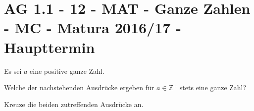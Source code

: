 \section{AG 1.1 - 12 - MAT - Ganze Zahlen - MC - Matura 2016/17 - Haupttermin}

\begin{beispiel}[AG 1.1]{1} %
	Es sei $a$ eine positive ganze Zahl.
			
Welche der nachstehenden Ausdrücke ergeben für $a\in \mathbb{Z}^+$ stets eine ganze Zahl? 

Kreuze die beiden zutreffenden Ausdrücke an.

\end{beispiel}